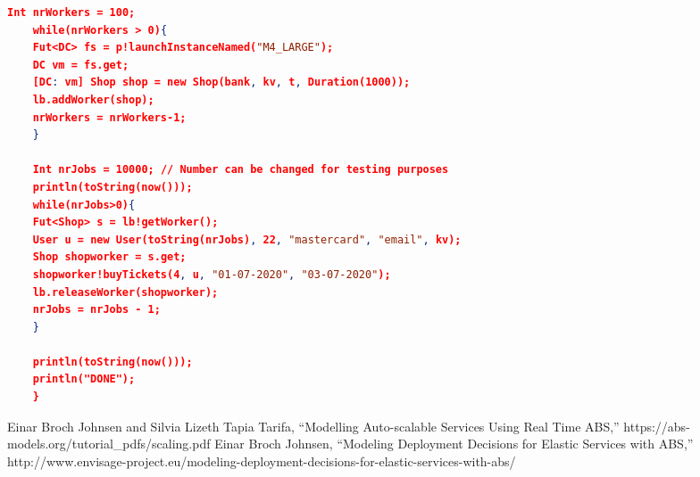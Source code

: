 \documentclass[conference]{IEEEtran}
\begin{document}
\begin{appendices}
\begin{lstlisting}[language=json]
	Int nrWorkers = 100;
	while(nrWorkers > 0){
	Fut<DC> fs = p!launchInstanceNamed("M4_LARGE"); 
	DC vm = fs.get;
	[DC: vm] Shop shop = new Shop(bank, kv, t, Duration(1000));
	lb.addWorker(shop); 
	nrWorkers = nrWorkers-1;
	}
	
	Int nrJobs = 10000;	// Number can be changed for testing purposes
	println(toString(now()));
	while(nrJobs>0){
	Fut<Shop> s = lb!getWorker();
	User u = new User(toString(nrJobs), 22, "mastercard", "email", kv);
	Shop shopworker = s.get;
	shopworker!buyTickets(4, u, "01-07-2020", "03-07-2020");
	lb.releaseWorker(shopworker);
	nrJobs = nrJobs - 1;
	} 
	
	println(toString(now())); 
	println("DONE");
	}
	\end{lstlisting}
	
\end{appendices}

\begin{thebibliography}{00}
 Einar Broch Johnsen and Silvia Lizeth Tapia Tarifa, ``Modelling Auto-scalable Services Using Real Time ABS,'' https://abs-models.org/tutorial\_pdfs/scaling.pdf
 Einar Broch Johnsen, ``Modeling Deployment Decisions for Elastic Services with ABS,'' http://www.envisage-project.eu/modeling-deployment-decisions-for-elastic-services-with-abs/

\end{thebibliography}
\end{document}
